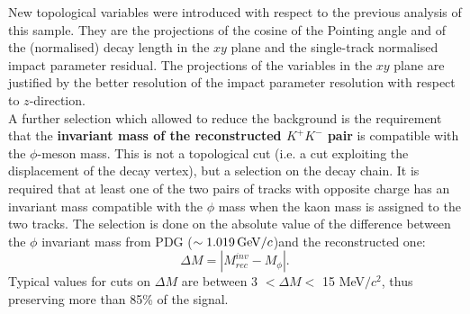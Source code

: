   New topological variables were introduced with respect to the 
  previous analysis of this sample. They are the projections of the cosine of 
the Pointing angle and of the (normalised) decay length in the $xy$ plane 
 and the single-track normalised impact parameter residual.
The projections of the variables in the $xy$ plane are justified by 
the better resolution of the impact parameter resolution with respect to $z$-direction.\\


A further selection which allowed to reduce the background is the requirement that the
 \textbf{invariant mass of the reconstructed $K^+K^-$ pair} is compatible 
 with the $\phi$-meson mass. This is not a topological 
 cut (i.e. a cut exploiting the displacement of the decay vertex), 
 but a selection on the decay chain. It is required that at least 
 one of the two pairs of tracks with opposite charge has an invariant
  mass compatible with the $\phi$ mass when the kaon mass is assigned to
  the two tracks. The selection is done on 
  the absolute value of the difference between the $\phi$ 
   invariant mass from PDG ($\sim 1.019\, \mathrm{GeV}/c$)and the reconstructed one:
\[
\Delta M = |M^{inv}_{rec}-M_{\phi}|.
\]
Typical values for cuts on $\Delta M$ are between 3 $<\Delta M<$ 15 MeV$/c^2$,
thus preserving more than 85\% of the signal.

